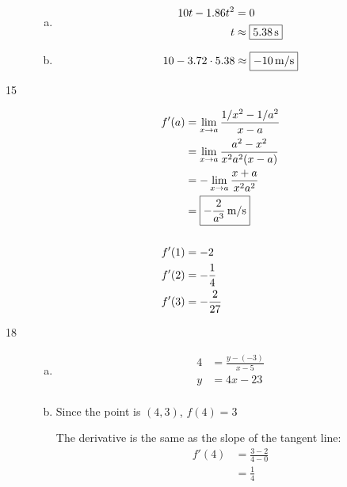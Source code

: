\documentclass[letterpaper, landscape]{exam}
\begin{document}
\begin{description}
\begin{enumerate}[(a)]
          \item
            \begin{align*}
              10t - 1.86t^2 & = 0 \\
              t             & \approx \boxed{ \unit[5.38]{s} } \\
            \end{align*}

          \item
            \[
              10 - 3.72 \cdot 5.38 \approx \boxed{ \unit[-10]{m/s} }
            \]

        \end{enumerate}

      \item[15]
        \begin{align*}
          f'(a) & = \lim_{x \to a} \frac{ 1/x^2 - 1/a^2}{x - a} \\
                & = \lim_{x \to a} \frac{ a^2 - x^2}{x^2a^2 (x - a)} \\
                & = - \lim_{x \to a} \frac{ x + a}{x^2a^2} \\
                & = \boxed{ \unit[- \frac{2}{a^3}]{m/s} } \\
          \\
          f'(1) & = -2 \\
          f'(2) & = - \frac{1}{4} \\
          f'(3) & = - \frac{2}{27} \\
        \end{align*}

      \newpage

      \item[18]
        \begin{enumerate}[(a)]

          \item 
            \begin{align*}
              4 & = \frac{y - (-3)}{x - 5} \\
              y & = 4x - 23 \\
            \end{align*}

          \item Since the point is $(4, 3)$, $f(4) = 3$

            The derivative is the same as the slope of the tangent line:
            \begin{align*}
              f'(4) & = \frac{3 - 2}{4 - 0} \\
                    & = \boxed{ \frac{1}{4} } \\
            \end{align*}


\end{enumerate}
\end{description}
\end{document}
